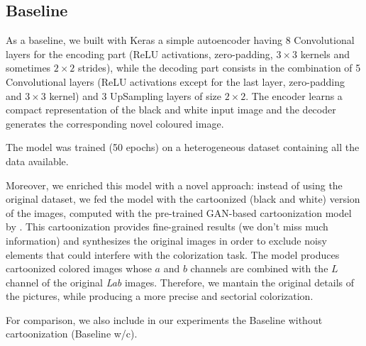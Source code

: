 \subsection{Baseline}
As a baseline, we built with Keras a simple autoencoder having 8 Convolutional layers for the encoding part
(ReLU activations, zero-padding, $3\times3$ kernels and sometimes $2\times2$ strides), while the decoding part
consists in the combination of 5 Convolutional layers (ReLU activations except for the last layer, zero-padding
and $3\times3$ kernel) and 3 UpSampling layers of size $2\times2$. The encoder learns a compact representation
of the black and white input image and the decoder generates the corresponding novel coloured image.

The model was trained (50 epochs) on a heterogeneous dataset containing all the data available.

Moreover, we enriched this model with a novel approach: instead of using the original dataset, we fed the model
with the cartoonized (black and white) version of the images, computed with the pre-trained GAN-based cartoonization
model by \cite{cartoonize}. This cartoonization provides fine-grained results (we don't miss much information)
and synthesizes the original images in order to exclude noisy elements that could interfere with the colorization
task. The model produces cartoonized colored images whose $a$ and $b$ channels are combined with the $L$ channel
of the original \textit{Lab} images. Therefore, we mantain the original details of the pictures, while producing a
more precise and sectorial colorization.

For comparison, we also include in our experiments the Baseline without cartoonization (Baseline w/c).